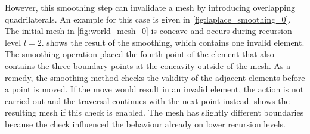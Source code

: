 However, this smoothing step can invalidate a mesh by introducing overlapping quadrilaterals. An example for this case is given in \cref{fig:laplace_smoothing_0}. The initial mesh in \cref{fig:world_mesh_0} is concave and occurs during recursion level $l=2$.  shows the result of the smoothing, which contains one invalid element. The smoothing operation placed the fourth point of the element that also contains the three boundary points at the concavity outside of the mesh. As a remedy, the smoothing method checks the validity of the adjacent elements before a point is moved. If the move would result in an invalid element, the action is not carried out and the traversal continues with the next point instead.
 shows the resulting mesh if this check is enabled. The mesh has slightly different boundaries because the check influenced the behaviour already on lower recursion levels.


